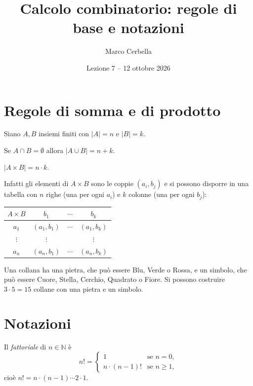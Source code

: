 \documentclass[11pt,a4paper]{article}
\title{Calcolo combinatorio: regole di base e notazioni}
\author{Marco Cerbella}
\date{Lezione 7 -- 12 ottobre 2026}
\begin{document}
\maketitle

\section{Regole di somma e di prodotto}

Siano $A, B$ insiemi finiti con $|A| = n$ e $|B| = k$.

\begin{proprieta}
Se $A \cap B = \emptyset$ allora $|A \cup B| = n + k$.
\end{proprieta}

\begin{proprieta}
$|A \times B| = n \cdot k$.
\end{proprieta}

Infatti gli elementi di $A \times B$ sono le coppie $(a_i, b_j)$ e si possono disporre in una tabella con $n$ righe (una per ogni $a_i$) e $k$ colonne (una per ogni $b_j$):
\begin{center}
\begin{tabular}{c|ccc}
$A \times B$ & $b_1$ & $\cdots$ & $b_k$ \\ \midrule
$a_1$ & $(a_1, b_1)$ & $\cdots$ & $(a_1, b_k)$ \\
$\vdots$ & $\vdots$ & & $\vdots$ \\
$a_n$ & $(a_n, b_1)$ & $\cdots$ & $(a_n, b_k)$
\end{tabular}
\end{center}

\begin{esempio}
Una collana ha una pietra, che può essere Blu, Verde o Rossa, e un simbolo, che può essere Cuore, Stella, Cerchio, Quadrato o Fiore. Si possono costruire $3 \cdot 5 = 15$ collane con una pietra e un simbolo.
\end{esempio}

\section{Notazioni}

\begin{definizione}
Il \emph{fattoriale} di $n \in \mathbb{N}$ è
\[
n! = \begin{cases} 1 & \text{se } n = 0, \\ n \cdot (n-1)! & \text{se } n \geq 1, \end{cases}
\]
cioè $n! = n \cdot (n-1) \cdots 2 \cdot 1$.
\end{definizione}
\end{document}
